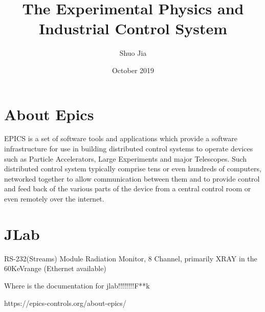 \documentclass{article}
\title{The Experimental Physics and Industrial Control System}
\author{Shuo Jia}
\date{October 2019}
\begin{document}
\maketitle

\section{About Epics}
EPICS is a set of software tools and applications which provide a software infrastructure for use in building distributed control systems to operate devices such as Particle Accelerators, Large Experiments and major Telescopes. Such distributed control system typically comprise tens or even hundreds of computers, networked together to allow communication between them and to provide control and feed back of the various parts of the device from a central control room or even remotely over the internet\cite{epicswebsite}. 

\section{JLab}
RS-232(Streams) Module Radiation Monitor, 8 Channel, primarily XRAY in the 60KeVrange (Ethernet available)

Where is the documentation for jlab!!!!!!!!F**k
\begin{thebibliography}{unsrt}
https://epics-controls.org/about-epics/
\end{thebibliography}
\end{document}
